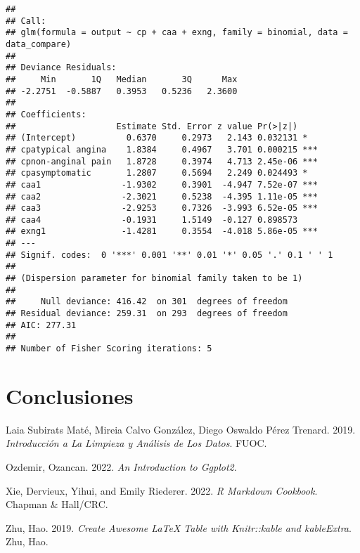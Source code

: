 \documentclass[
]{article}
\newlength{\cslhangindent}
\newlength{\cslentryspacingunit} %
\newenvironment{CSLReferences}[2] %
 {%
  \setlength{\parindent}{0pt}
  \ifodd #1
  \let\oldpar\par
  \def\par{\hangindent=\cslhangindent\oldpar}
  \fi
  \setlength{\parskip}{#2\cslentryspacingunit}
 }%
 {}
\begin{document}
\begin{verbatim}
## 
## Call:
## glm(formula = output ~ cp + caa + exng, family = binomial, data = data_compare)
## 
## Deviance Residuals: 
##     Min       1Q   Median       3Q      Max  
## -2.2751  -0.5887   0.3953   0.5236   2.3600  
## 
## Coefficients:
##                    Estimate Std. Error z value Pr(>|z|)    
## (Intercept)          0.6370     0.2973   2.143 0.032131 *  
## cpatypical angina    1.8384     0.4967   3.701 0.000215 ***
## cpnon-anginal pain   1.8728     0.3974   4.713 2.45e-06 ***
## cpasymptomatic       1.2807     0.5694   2.249 0.024493 *  
## caa1                -1.9302     0.3901  -4.947 7.52e-07 ***
## caa2                -2.3021     0.5238  -4.395 1.11e-05 ***
## caa3                -2.9253     0.7326  -3.993 6.52e-05 ***
## caa4                -0.1931     1.5149  -0.127 0.898573    
## exng1               -1.4281     0.3554  -4.018 5.86e-05 ***
## ---
## Signif. codes:  0 '***' 0.001 '**' 0.01 '*' 0.05 '.' 0.1 ' ' 1
## 
## (Dispersion parameter for binomial family taken to be 1)
## 
##     Null deviance: 416.42  on 301  degrees of freedom
## Residual deviance: 259.31  on 293  degrees of freedom
## AIC: 277.31
## 
## Number of Fisher Scoring iterations: 5
\end{verbatim}

\hypertarget{conclusiones}{%
\section*{Conclusiones}\label{conclusiones}}

\hypertarget{refs}{}
\begin{CSLReferences}{1}{0}
\leavevmode{}%
Laia Subirats Maté, Mireia Calvo González, Diego Oswaldo Pérez Trenard.
2019. \emph{Introducción a La Limpieza y Análisis de Los Datos}. FUOC.

\leavevmode{}%
Ozdemir, Ozancan. 2022. \emph{An Introduction to Ggplot2}.

\leavevmode{}%
Xie, Dervieux, Yihui, and Emily Riederer. 2022. \emph{R Markdown
Cookbook}. Chapman \& Hall/CRC.

\leavevmode{}%
Zhu, Hao. 2019. \emph{Create Awesome LaTeX Table with Knitr::kable and
kableExtra}. Zhu, Hao.

\end{CSLReferences}
\end{document}
